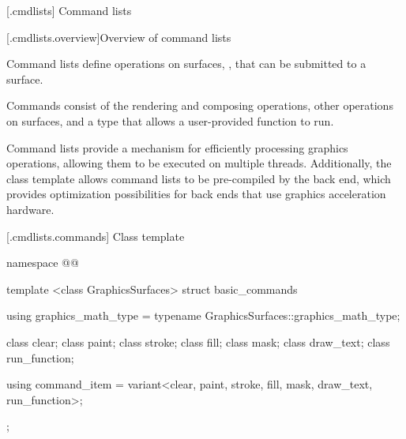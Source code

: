 
 [\iotwod.cmdlists] {Command lists}

 [\iotwod.cmdlists.overview]{Overview of command lists}

\pnum
Command lists define operations on surfaces, , that can be submitted to a surface.

\pnum
Commands consist of the rendering and composing operations, other operations on surfaces, and a type that allows a user-provided function to run.

\pnum
Command lists provide a mechanism for efficiently processing graphics operations, allowing them to be executed on multiple threads. Additionally, the  class template allows command lists to be pre-compiled by the back end, which provides optimization possibilities for back ends that use graphics acceleration hardware.

%
 [\iotwod.cmdlists.commands] {Class template }

\addtocounter{SectionDepthBase}{2}


%
%






\addtocounter{SectionDepthBase}{-2}

\begin{codeblock}
namespace @\fullnamespace{}@ {
  template <class GraphicsSurfaces>
  struct basic_commands {
    using graphics_math_type = typename GraphicsSurfaces::graphics_math_type;

    class clear;
    class paint;
    class stroke;
    class fill;
    class mask;
    class draw_text;
    class run_function;
  }
  using command_item = variant<clear, paint, stroke, fill, mask, draw_text, 
    run_function>;
  };
\end{codeblock}
